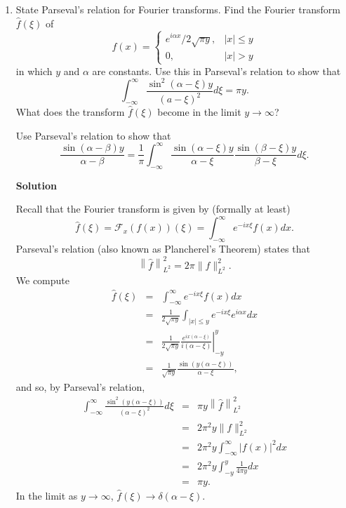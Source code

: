 \documentclass{article}
\begin{document}
\begin{enumerate}
\item State Parseval's relation for Fourier transforms.  Find the Fourier transform \(\widehat{f}(\xi)\) of
\[f(x) = \begin{cases} e^{i \alpha x} / 2 \sqrt{\pi y}, & |x| \leq y \\ 0, & |x| > y \end{cases}\]
in which \(y\) and \(\alpha\) are constants.  Use this in Parseval's relation to show that
\[\int_{-\infty}^{\infty} \frac{\sin^2(\alpha - \xi) y}{(a - \xi)^2} d\xi = \pi y.\]
What does the transform \(\widehat{f}(\xi)\) become in the limit \(y \to \infty\)?

Use Parseval's relation to show that
\[\frac{\sin(\alpha - \beta) y}{\alpha - \beta} = \frac{1}{\pi} \int_{-\infty}^{\infty} \frac{\sin (\alpha - \xi) y}{\alpha - \xi} \frac{\sin (\beta - \xi) y}{\beta - \xi} d\xi.\]

{\bf Solution}

Recall that the Fourier transform is given by (formally at least)
\[\widehat{f}(\xi) = \mathcal{F}_x(f(x))(\xi) = \int_{-\infty}^{\infty} e^{-i x \xi} f(x) dx.\]
Parseval's relation (also known as Plancherel's Theorem) states that
\[\left\| \widehat{f} \right\|_{L^2}^2 = 2 \pi \|f\|_{L^2}^2.\]
We compute
\begin{eqnarray*}
\widehat{f}(\xi)
& = & \int_{-\infty}^{\infty} e^{-i x \xi} f(x) dx \\
& = & \frac{1}{2 \sqrt{\pi y}} \int_{|x| \leq y} e^{-i x \xi} e^{i \alpha x} dx \\
& = & \left. \frac{1}{2 \sqrt{\pi y}} \frac{e^{i x (\alpha - \xi)}}{i (\alpha - \xi)} \right|_{-y}^y \\
& = & \frac{1}{\sqrt{\pi y}} \frac{\sin(y(\alpha - \xi))}{\alpha - \xi},
\end{eqnarray*}
and so, by Parseval's relation,
\begin{eqnarray*}
\int_{-\infty}^{\infty} \frac{\sin^2(y(\alpha - \xi))}{(\alpha - \xi)^2} d\xi
& = & \pi y \left\| \widehat{f} \right\|_{L^2}^2 \\
& = & 2 \pi^2 y \|f\|_{L^2}^2 \\
& = & 2 \pi^2 y \int_{-\infty}^{\infty} |f(x)|^2 dx \\
& = & 2 \pi^2 y \int_{-y}^y \frac{1}{4 \pi y} dx \\
& = & \pi y.
\end{eqnarray*}
In the limit as \(y \to \infty\), \(\widehat{f}(\xi) \to \delta(\alpha - \xi)\).


\end{enumerate}
\end{document}
